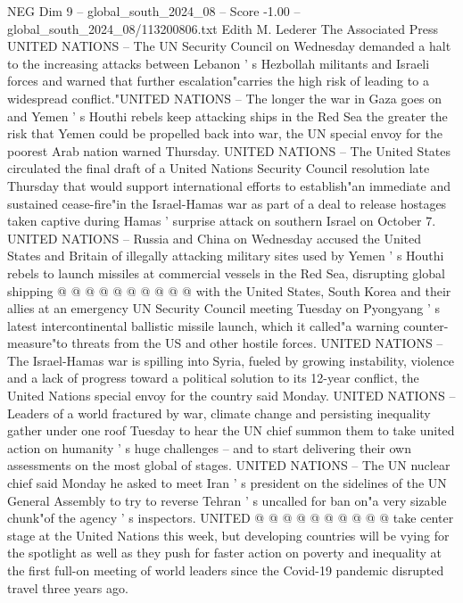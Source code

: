 \begin{textsample}{NEG Dim 9 – global\_south\_2024\_08 – Score -1.00 – global\_south\_2024\_08/113200806.txt}  \label{ex:f9_neg_340}
Edith M.
Lederer The Associated Press UNITED NATIONS -- The UN Security Council on Wednesday demanded a halt to the increasing attacks between Lebanon ' s Hezbollah militants and Israeli forces and warned that further escalation"carries the high risk of leading to a widespread conflict."UNITED NATIONS -- The longer the war in Gaza goes on and Yemen ' s Houthi rebels keep attacking ships in the Red Sea the greater the risk that Yemen could be propelled back into war, the UN special envoy for the poorest Arab nation warned Thursday.
UNITED NATIONS -- The United States circulated the final draft of a United Nations Security Council resolution late Thursday that would support international efforts to establish"an immediate and sustained cease-fire"in the Israel-Hamas war as part of a deal to release hostages taken captive during Hamas ' surprise attack on southern Israel on October 7.
UNITED NATIONS -- Russia and China on Wednesday accused the United States and Britain of illegally attacking military sites used by Yemen ' s Houthi rebels to launch missiles at commercial vessels in the Red Sea, disrupting global shipping @ @ @ @ @ @ @ @ @ @ with the United States, South Korea and their allies at an emergency UN Security Council meeting Tuesday on Pyongyang ' s latest intercontinental ballistic missile launch, which it called"a warning counter-measure"to threats from the US and other hostile forces.
UNITED NATIONS -- The Israel-Hamas war is spilling into Syria, fueled by growing instability, violence and a lack of progress toward a political solution to its 12-year conflict, the United Nations special envoy for the country said Monday.
UNITED NATIONS -- Leaders of a world fractured by war, climate change and persisting inequality gather under one roof Tuesday to hear the UN chief summon them to take united action on humanity ' s huge challenges -- and to start delivering their own assessments on the most global of stages.
UNITED NATIONS -- The UN nuclear chief said Monday he asked to meet Iran ' s president on the sidelines of the UN General Assembly to try to reverse Tehran ' s uncalled for ban on"a very sizable chunk"of the agency ' s inspectors.
UNITED @ @ @ @ @ @ @ @ @ @ take center stage at the United Nations this week, but developing countries will be vying for the spotlight as well as they push for faster action on poverty and inequality at the first full-on meeting of world leaders since the Covid-19 pandemic disrupted travel three years ago.

\end{textsample}
